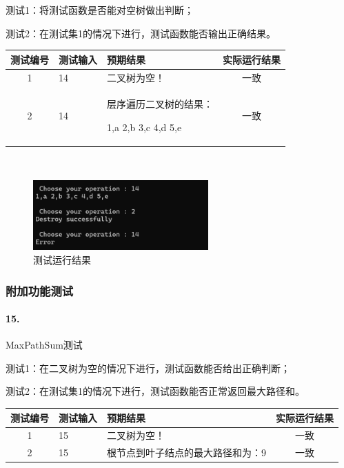 \documentclass[supercite]{Experimental_Report}
\theoremstyle{definition}
\begin{document}
测试1：将测试函数是否能对空树做出判断；

测试2：在测试集1的情况下进行，测试函数能否输出正确结果。

\vspace{0.5em}

\begin{tabular}{|c|p{2.7cm}|p{4.5cm}|c|}
	\hline
	测试编号 & 测试输入 & 预期结果 & 实际运行结果 \\
	\hline
	1 & 14 & 二叉树为空！ & 一致 \\
	\hline
	2 & 14 & 层序遍历二叉树的结果：

 1,a 2,b 3,c 4,d 5,e & 一致 \\
	\hline
\end{tabular}

~\

\begin{figure}[H]
 	\centering
 	\includegraphics[width=0.6\textwidth]{images/二叉树测试14.png}
 	\caption{测试运行结果}
 	\label{txlab}
 \end{figure}

\subsubsection{附加功能测试}

\paragraph{15.}MaxPathSum测试
	
测试1：在二叉树为空的情况下进行，测试函数能否给出正确判断；

测试2：在测试集1的情况下进行，测试函数能否正常返回最大路径和。

\vspace{0.5em}

\begin{tabular}{|c|p{2.7cm}|p{6cm}|c|}
	\hline
	测试编号 & 测试输入 & 预期结果 & 实际运行结果 \\
	\hline
	1 & 15 & 二叉树为空！ & 一致 \\
	\hline
	2 & 15 & 根节点到叶子结点的最大路径和为：9 & 一致 \\
	\hline
\end{tabular}
\end{document}
